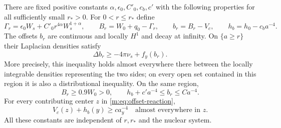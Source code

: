 \begin{lemma}\label{m:lem:barrier-subsolution}
There are fixed positive constants $\alpha,\epsilon_0,C'_0,c_b,c'$
with the following properties for all
sufficiently small $r_*>0$.  For $0<r\le r_*$ define
\begin{equation}\label{m:eq:barrier-definition}
 \Gamma_r=\epsilon_0W_s+C'_0r^{4\alpha}W_s^{1+\alpha},\qquad
 B_r=W_0+q_0-\Gamma_r,\qquad b_r=B_r-V_c,
 \qquad h_b=h_0-c_ba^{-4}.
\end{equation}
The offsets $b_r$ are continuous and locally $H^1$ and decay at infinity.
On $\{a\ge r\}$ their Laplacian densities satisfy
\begin{equation}\label{m:eq:barrier-subsolution}
 \Delta b_r\ge-4\pi\nu_s+f_y(b_r).
\end{equation}
More precisely, this inequality holds almost everywhere there between
the locally integrable densities representing the two sides; on every
open set contained in this region it is also a distributional inequality.
On the same region,
\begin{equation}\label{m:eq:barrier-bounds}
 B_r\ge0.9W_0>0,\qquad
 h_b+c'a^{-4}\le b_r\le Ca^{-4}.
\end{equation}
For every contributing center $z$ in \eqref{m:eq:offset-reaction},
\begin{equation}\label{m:eq:reaction-positive-margin}
 V_c(z)+h_b(y)\ge ca_y^{-4}
 \quad\text{almost everywhere in }z.
\end{equation}
All these constants are independent of $r,r_*$ and the nuclear system.
\end{lemma}

